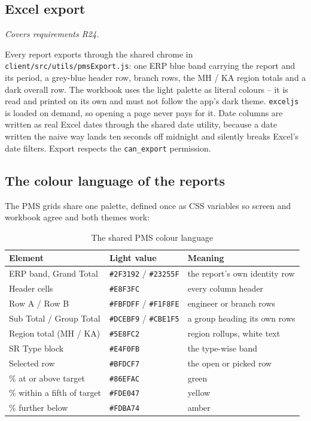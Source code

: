 \documentclass[11pt,a4paper]{article}
\newcommand{\covers}[1]{\textit{Covers requirements #1.}\par}
\newcommand{\file}[1]{\texttt{\small #1}}
\begin{document}
\subsection{Excel export}
\covers{R24}
Every report exports through the shared chrome in \file{client/src/utils/pmsExport.js}: one
ERP blue band carrying the report and its period, a grey-blue header row, branch rows, the
MH / KA region totals and a dark overall row. The workbook uses the light palette as
literal colours -- it is read and printed on its own and must not follow the app's dark
theme. \file{exceljs} is loaded on demand, so opening a page never pays for it. Date
columns are written as real Excel dates through the shared date utility, because a date
written the naive way lands ten seconds off midnight and silently breaks Excel's date
filters. Export respects the \file{can\_export} permission.

\subsection{The colour language of the reports}
The PMS grids share one palette, defined once as CSS variables so screen and workbook
agree and both themes work:

\begin{table}[H]\centering\small
\begin{tabularx}{\linewidth}{@{}p{3.4cm}p{2.4cm}X@{}}
\toprule
\textbf{Element} & \textbf{Light value} & \textbf{Meaning} \\
\midrule
ERP band, Grand Total & \texttt{\#2F3192} / \texttt{\#23255F} & the report's own identity
row \\
Header cells & \texttt{\#E8F3FC} & every column header \\
Row A / Row B & \texttt{\#FBFDFF} / \texttt{\#F1F8FE} & engineer or branch rows \\
Sub Total / Group Total & \texttt{\#DCEBF9} / \texttt{\#CBE1F5} & a group heading its own
rows \\
Region total (MH / KA) & \texttt{\#5E8FC2} & region rollups, white text \\
SR Type block & \texttt{\#E4F0FB} & the type-wise band \\
Selected row & \texttt{\#BFDCF7} & the open or picked row \\
\% at or above target & \texttt{\#86EFAC} & green \\
\% within a fifth of target & \texttt{\#FDE047} & yellow \\
\% further below & \texttt{\#FDBA74} & amber \\
\bottomrule
\end{tabularx}
\caption{The shared PMS colour language}
\end{table}
\end{document}

